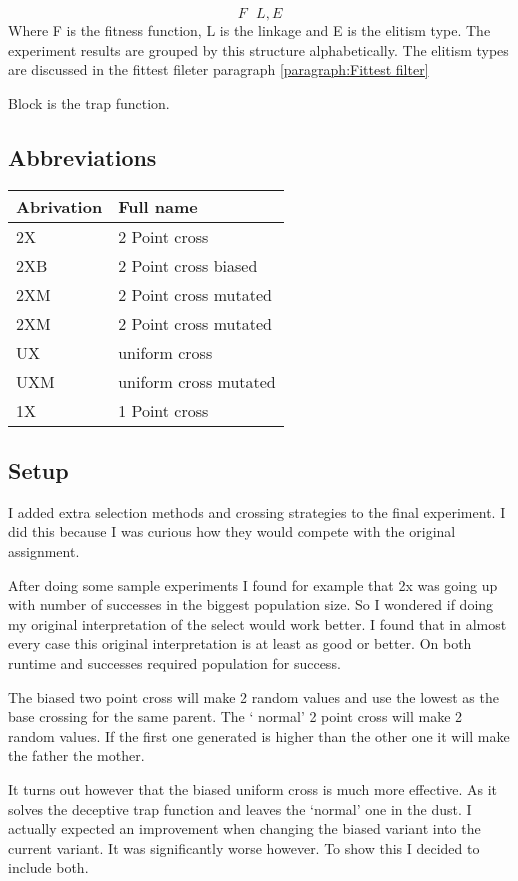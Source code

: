 \documentclass{article}
\begin{document}
\begin{empfile}
\[F\mbox{ }L, E\]
Where F is the fitness function, L is the linkage and E is the elitism type.
The experiment results are grouped by this structure alphabetically.
The elitism types are discussed in the fittest fileter paragraph \ref{paragraph:Fittest filter}

Block is the trap function.

\subsection{Abbreviations}
\begin{tabular}{ll}
	Abrivation & Full name \\ \toprule
	2X & 2 Point cross \\
	2XB & 2 Point cross biased \\
	2XM & 2 Point cross mutated \\
	2XM & 2 Point cross mutated \\
	UX & uniform cross \\
	UXM & uniform cross mutated \\
	1X & 1 Point cross \\ \bottomrule
\end{tabular}

\subsection{Setup}
I added extra selection methods and crossing strategies to
the final experiment. I did this because I was curious how they would
compete with the original assignment.

After doing some sample experiments I found for example that 2x was going
up with number of successes in the biggest population size. So I wondered 
if doing my original interpretation of the select would work better.
I found that in almost every case this original interpretation is at least as
good or better. On both runtime and successes required population for success.

The biased two point cross will make 2 random values and use the lowest as
the base crossing for the same parent. The ` normal' 2 point cross will make
2 random values. If the first one generated is higher than the other one it
will make the father the mother.

It turns out however that the biased uniform cross is much more effective.
As it solves the deceptive trap function and leaves the `normal' one in
the dust. I actually expected an improvement when changing the biased
variant into the current variant. It was significantly worse however.
To show this I decided to include both.


\end{empfile}
\end{document}
